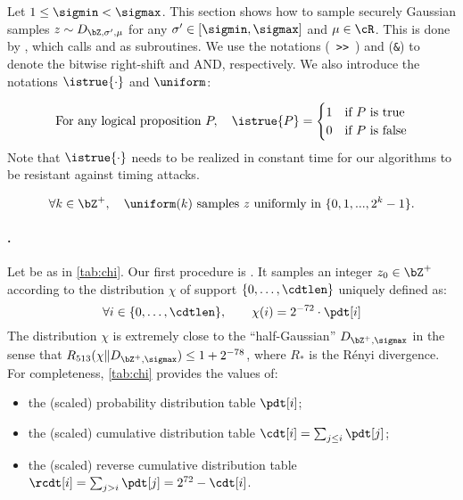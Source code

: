 \newcommand{\rightshift}{\ \texttt{>>}\ }

Let $1 \leq \sigmin < \sigmax$. This section shows how to sample securely Gaussian samples $z \sim D_{\bZ, \sigma', \mu}$ for any $\sigma' \in [\sigmin, \sigmax]$ and $\mu \in \cR$. This is done by \longsamplerz, which calls \longbasesampler and \longberexp as subroutines. We use the notations (\rightshift) and (\texttt{\&}) to denote the bitwise right-shift and AND, respectively. We also introduce the notations $\istrue{\cdot}$ and $\uniform$:

\begin{equation}
\text{For any logical proposition }P, \quad \istrue{P} =
\begin{cases}
1 & \text{if $P$ is true} \\
0 & \text{if $P$ is false} \\
\end{cases}
\end{equation}
Note that $\istrue{\cdot}$ needs to be realized in constant time for our algorithms to be resistant against timing attacks.

\begin{equation}\label{eq:uniform}
\forall k \in \bZ^+, \quad \uniform(k) \text{ samples $z$ uniformly in $\{0, 1, ..., 2^k - 1\}$.}
\end{equation}


\paragraph{\basesampler.} Let \pdt be as in \cref{tab:chi}. Our first procedure is \longbasesampler. It samples an integer $z_0 \in \bZ^+$ according to the distribution $\chi$ of support $\{0, \dots, \cdtlen\}$ uniquely defined as:
\begin{equation}\label{eq:chi}
\forall i \in \{0, \dots, \cdtlen\}, \qquad \chi(i) = 2^{-72} \cdot \pdt[i]
\end{equation}
The distribution $\chi$ is extremely close to the ``half-Gaussian'' $D_{\bZ^+, \sigmax}$ in the sense that $R_{513}(\chi \| D_{\bZ^+, \sigmax}) \leq 1 + 2^{-78}$, where $R_*$ is the R\'enyi divergence. For completeness, \cref{tab:chi} provides the values of:
\begin{itemize}[nolistsep,noitemsep]
	\item the (scaled) probability distribution table $\pdt[i]$;
	\item the (scaled) cumulative distribution table $\cdt[i] = \sum_{j\leq i} \pdt[j]$;
	\item the (scaled) reverse cumulative distribution table $\rcdt[i] = \sum_{j > i} \pdt[j] = 2^{72} - \cdt[i]$.
\end{itemize}

